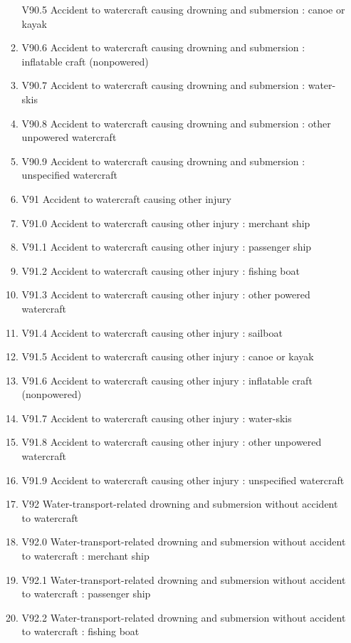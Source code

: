 \documentclass[
]{scrartcl}
\begin{document}
\begin{itemize}
\begin{enumerate}
    V90.5 Accident to watercraft causing drowning and submersion : canoe
    or kayak
  \item
    V90.6 Accident to watercraft causing drowning and submersion :
    inflatable craft (nonpowered)
  \item
    V90.7 Accident to watercraft causing drowning and submersion :
    water-skis
  \item
    V90.8 Accident to watercraft causing drowning and submersion : other
    unpowered watercraft
  \item
    V90.9 Accident to watercraft causing drowning and submersion :
    unspecified watercraft
  \item
    V91 Accident to watercraft causing other injury
  \item
    V91.0 Accident to watercraft causing other injury : merchant ship
  \item
    V91.1 Accident to watercraft causing other injury : passenger ship
  \item
    V91.2 Accident to watercraft causing other injury : fishing boat
  \item
    V91.3 Accident to watercraft causing other injury : other powered
    watercraft
  \item
    V91.4 Accident to watercraft causing other injury : sailboat
  \item
    V91.5 Accident to watercraft causing other injury : canoe or kayak
  \item
    V91.6 Accident to watercraft causing other injury : inflatable craft
    (nonpowered)
  \item
    V91.7 Accident to watercraft causing other injury : water-skis
  \item
    V91.8 Accident to watercraft causing other injury : other unpowered
    watercraft
  \item
    V91.9 Accident to watercraft causing other injury : unspecified
    watercraft
  \item
    V92 Water-transport-related drowning and submersion without accident
    to watercraft
  \item
    V92.0 Water-transport-related drowning and submersion without
    accident to watercraft : merchant ship
  \item
    V92.1 Water-transport-related drowning and submersion without
    accident to watercraft : passenger ship
  \item
    V92.2 Water-transport-related drowning and submersion without
    accident to watercraft : fishing boat

\end{enumerate}
\end{itemize}
\end{document}
